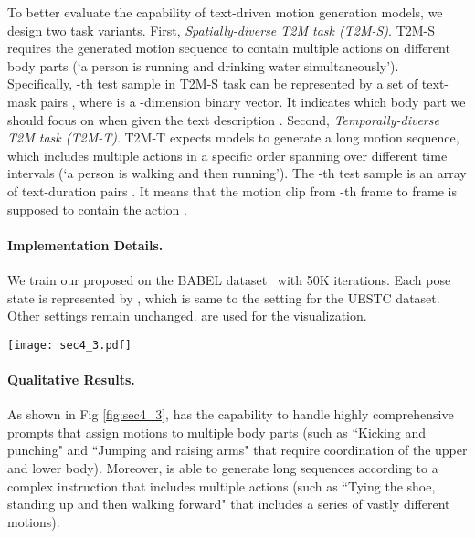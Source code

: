 To better evaluate the capability of text-driven motion generation models, we design two task variants. 
First, \textit{Spatially-diverse T2M task (T2M-S)}. T2M-S requires the generated motion sequence to contain multiple actions on different body parts (\eg `a person is running and drinking water simultaneously'). Specifically, -th test sample in T2M-S task can be represented by a set of text-mask pairs , where  is a -dimension binary vector. It indicates which body part we should focus on when given the text description .
Second, \textit{Temporally-diverse T2M task (T2M-T)}. T2M-T expects models to generate a long motion sequence, which includes multiple actions in a specific order spanning over different time intervals (\eg `a person is walking and then running'). The -th test sample is an array of text-duration pairs . It means that the motion clip from  -th frame to  frame is supposed to contain the action .

\paragraph{Implementation Details.}\label{sec4_3_2} 
We train our proposed \name on the BABEL dataset~\citep{punnakkal2021babel} with 50K iterations. Each pose state is represented by , which is same to the setting for the UESTC dataset. Other settings remain unchanged.  are used for the visualization.

\begin{figure*}[t]
    \centering
    \texttt{[image: sec4\_3.pdf]}
    \caption{\textbf{Qualitative results on the BABEL dataset.} \name is able to generate dynamic sequences according to complicated prompt that involves multiple body parts or actions.}
    \label{fig:sec4_3}
\end{figure*}

\paragraph{Qualitative Results.}\label{sec4_3_4}
As shown in Fig \ref{fig:sec4_3}, \name has the capability to handle highly comprehensive prompts that assign motions to multiple body parts (such as ``Kicking and punching" and ``Jumping and raising arms" that require coordination of the upper and lower body). Moreover, \name is able to generate long sequences according to a complex instruction that includes multiple actions (such as ``Tying the shoe, standing up and then walking forward" that includes a series of vastly different motions).


